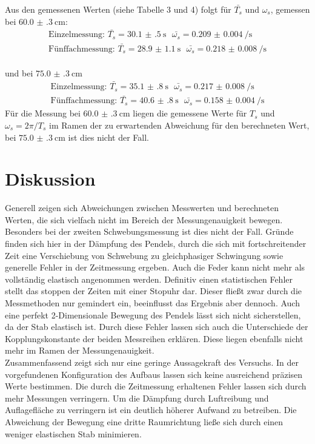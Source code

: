 Aus den gemessenen Werten (siehe Tabelle 3 und 4) folgt für $\bar{T_s}$ und $\omega_s$, gemessen bei $\SI{60.0(3)}{\centi\metre}$:
\begin{equation*}
\begin{split}
 \text{Einzelmessung: }\bar{T_{s}} = \SI{30.1(5)}{\second} \ \ \ \bar{\omega_s}= \SI{0.209(4)}{\per\second}\\
 \text{Fünffachmessung: }\bar{T_{s}} = \SI{28.9(11)}{\second} \ \ \ \bar{\omega_s} = \SI{0.218(8)}{\per\second}
\end{split}
\end{equation*}
\\ und bei $\SI{75.0(3)}{\centi\metre}$
\begin{equation*}
\begin{split}
 \text{Einzelmessung: }\bar{T_{s}} = \SI{35.1(8)}{\second} \ \ \ \bar{\omega_s} = \SI{0.217(8)}{\per\second}\\
 \text{Fünffachmessung: }\bar{T_{s}} = \SI{40.6(8)}{\second} \ \ \ \bar{\omega_s} = \SI{0.158(4)}{\per\second}
\end{split}
\end{equation*}
Für die Messung bei $\SI{60.0(3)}{\centi\metre}$ liegen die gemessene Werte für $T_s$ und $ \omega_s = 2\pi/T_s$ im Ramen der zu erwartenden Abweichung für den berechneten Wert,
bei $\SI{75.0(3)}{\centi\metre}$ ist dies nicht der Fall.
\section{Diskussion}
Generell zeigen sich Abweichungen zwischen Messwerten und berechneten Werten, die sich vielfach nicht im Bereich der Messungenauigkeit bewegen.
Besonders bei der zweiten Schwebungsmessung ist dies nicht der Fall. Gründe finden sich hier in der Dämpfung des Pendels, durch die sich mit fortschreitender Zeit eine
Verschiebung von Schwebung zu gleichphasiger Schwingung sowie generelle Fehler in der Zeitmessung ergeben. Auch die Feder kann nicht mehr als vollständig elastisch
angenommen werden. Definitiv einen statistischen Fehler stellt das stoppen der Zeiten mit einer Stopuhr dar. Dieser fließt zwar durch die Messmethoden nur gemindert ein,
beeinflusst das Ergebnis aber dennoch. Auch eine perfekt 2-Dimensionale Bewegung des Pendels lässt sich nicht sicherstellen, da der Stab elastisch ist.
Durch diese Fehler lassen sich auch die Unterschiede der Kopplungskonstante der beiden Messreihen erklären. Diese liegen ebenfalls nicht mehr im Ramen der Messungenauigkeit.
\\
Zusammenfassend zeigt sich nur eine geringe Aussagekraft des Versuchs. In der vorgefundenen Konfiguration des Aufbaus lassen sich keine ausreichend präzisen Werte bestimmen.
Die durch die Zeitmessung erhaltenen Fehler lassen sich durch mehr Messungen verringern. Um die Dämpfung durch Luftreibung und Auflagefläche zu verringern ist ein deutlich höherer
Aufwand zu betreiben. Die Abweichung der Bewegung eine dritte Raumrichtung ließe sich durch einen weniger elastischen Stab minimieren.

\newpage
\nocite{*}
\printbibliography
